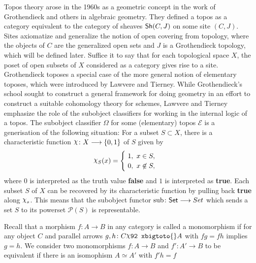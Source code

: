 Topos theory arose in the 1960s as a geometric concept in the work of Grothendieck and others in algebraic geometry. They defined a topos as a category equivalent to the category of sheaves $\operatorname{\mathsf{Sh}}(C,J)$ on some site $(C,J)$. Sites axiomatize and generalize the notion of open covering from topology, where the objects of $C$ are the generalized open sets and $J$ is a Grothendieck topology, which will be defined later. Suffice it to say that for each topological space $X$, the poset of open subsets of $X$ considered as a category gives rise to a site. Grothendieck toposes a special case of the more general notion of elementary toposes, which were introduced by Lawvere and Tierney. While Grothendieck's school sought to construct a general framework for doing geometry in an effort to construct a suitable cohomology theory for schemes, Lawvere and Tierney emphasize the role of the subobject classifiers for working in the internal logic of a topos. The subobject classifier $\Omega$ for some (elementary) topos $\mathcal{E}$ is a generisation of the following situation:
For a subset $S \subset X$, there is a characteristic function $\char \colon X \to \{0, 1\}$ of $S$ given by
\[ \char_S(x) =
	\begin{cases}
		\ 1,\ x \in S, \\
		\ 0,\ x \not \in S,
	\end{cases}
\]
where $0$ is interpreted as the truth value \textbf{false} and $1$ is interpreted as \textbf{true}. Each subset $S$ of $X$ can be recovered by its characteristic function by pulling back \textbf{true} along $\char_s$. This means that the subobject functor $\text{sub} \colon \mathsf{Set} \longrightarrow Set$ which sends a set $S$  to its powerset $\mathcal{P}(S)$ is representable.

\begin{construction}[Subobjects]
	Recall that a morphism $f \colon A \to B$ in any category is called a monomorphism if for any object $C$ and parallel arrows $g, h \colon C \xbigtoto{} A$ with $fg = fh$ implies $g = h$. We consider two monomorphisms $f \colon A \to B$ and $f' \colon A' \to B$ to be equivalent if there is an isomophism $A \simeq A'$ with $f'h = f$
\end{construction}

